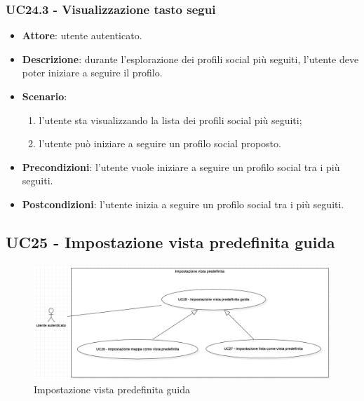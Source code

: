 \subsubsection{UC24.3 - Visualizzazione tasto segui}
\begin{itemize}
    \item \textbf{Attore}: utente autenticato.
    \item \textbf{Descrizione}: durante l'esplorazione dei profili social più seguiti,
    l'utente deve poter iniziare a seguire il profilo. 
    \item \textbf{Scenario}:
    \begin{enumerate}
        \item l'utente sta visualizzando la lista dei profili social più seguiti;
        \item l'utente può iniziare a seguire un profilo social proposto.
    \end{enumerate}
    \item \textbf{Precondizioni}: l'utente vuole iniziare a seguire un profilo social tra i più seguiti.
    \item \textbf{Postcondizioni}: l'utente inizia a seguire un profilo social tra i più seguiti.
\end{itemize}

\subsection{UC25 - Impostazione vista predefinita guida}
\begin{figure}[!h]
    \includegraphics[width=15cm]{sezioni/Images/UC25_s.png}
    \centering
    \caption{Impostazione vista predefinita guida}
\end{figure}

